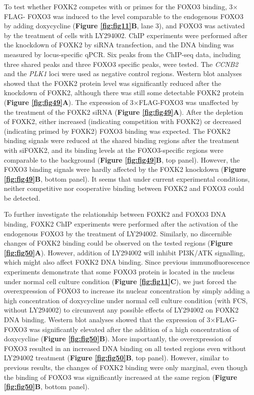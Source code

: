 To test whether FOXK2 competes with or primes for the FOXO3 binding, 3$\times$FLAG- FOXO3 was induced to the level comparable to the endogenous FOXO3 by adding doxycycline (\textbf{Figure \ref{fig:fig11}B}, lane 3), and FOXO3 was activated by the treatment of cells with LY294002. ChIP experiments were performed after the knockdown of FOXK2 by siRNA transfection, and the DNA binding was measured by locus-specific qPCR. Six peaks from the ChIP-seq data, including three shared peaks and three FOXO3 specific peaks, were tested. The \textit{CCNB2} and the \textit{PLK1} loci were used as negative control regions. Western blot analyses showed that the FOXK2 protein level was significantly reduced after the knockdown of FOXK2, although there was still some detectable FOXK2 protein (\textbf{Figure \ref{fig:fig49}A}). The expression of 3$\times$FLAG-FOXO3 was unaffected by the treatment of the FOXK2 siRNA (\textbf{Figure \ref{fig:fig49}A}). After the depletion of FOXK2, either increased (indicating competition with FOXK2) or decreased (indicating primed by FOXK2) FOXO3 binding was expected. The FOXK2 binding signals were reduced at the shared binding regions after the treatment with siFOXK2, and its binding levels at the FOXO3-specific regions were comparable to the background (\textbf{Figure \ref{fig:fig49}B}, top panel). However, the FOXO3 binding signals were hardly affected by the FOXK2 knockdown (\textbf{Figure \ref{fig:fig49}B}, bottom panel). It seems that under current experimental conditions, neither competitive nor cooperative binding between FOXK2 and FOXO3 could be detected.

To further investigate the relationship between FOXK2 and FOXO3 DNA binding, FOXK2 ChIP experiments were performed after the activation of the endogenous FOXO3 by the treatment of LY294002. Similarly, no discernible changes of FOXK2 binding could be observed on the tested regions (\textbf{Figure \ref{fig:fig50}A}). However, addition of LY294002 will inhibit PI3K/ATK signalling, which might also affect FOXK2 DNA binding. Since previous immunofluorescence experiments demonstrate that some FOXO3 protein is located in the nucleus under normal cell culture condition (\textbf{Figure \ref{fig:fig11}C}), we just forced the overexpression of FOXO3 to increase its nuclear concentration by simply adding a high concentration of doxycycline under normal cell culture condition (with FCS, without LY294002) to circumvent any possible effects of LY294002 on FOXK2 DNA binding. Western blot analyses showed that the expression of 3$\times$FLAG-FOXO3 was significantly elevated after the addition of a high concentration of doxycycline (\textbf{Figure \ref{fig:fig50}B}). More importantly, the overexpression of FOXO3 resulted in an increased DNA binding on all tested regions even without LY294002 treatment (\textbf{Figure \ref{fig:fig50}B}, top panel). However, similar to previous results, the changes of FOXK2 binding were only marginal, even though the binding of FOXO3 was significantly increased at the same region (\textbf{Figure \ref{fig:fig50}B}, bottom panel).


